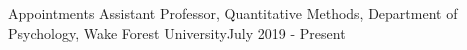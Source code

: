 \begin{rSection}{\textrm{Appointments}}
Assistant Professor, Quantitative Methods, Department of Psychology, Wake Forest University\hfill{July 2019 - Present}
\end{rSection}